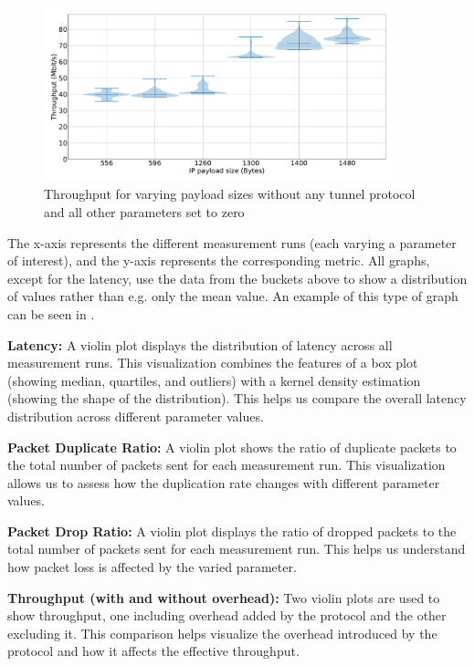\begin{figure}[tbh]
	\centering
	\includegraphics[draft=false,width=0.9\textwidth]{figures/Graphs/graph-4-mtu/throughput.pdf}
	\caption{Throughput for varying payload sizes without any tunnel protocol and all other parameters set to zero}
	\label{fig:graph-4-mtu-throughput}
\end{figure}

The x-axis represents the different measurement runs (each varying a parameter of interest), and the y-axis represents the corresponding metric.
All graphs, except for the latency, use the data from the buckets above to show a distribution of values rather than e.g. only the mean value.
An example of this type of graph can be seen in .

\noindent\textbf{Latency:} A violin plot displays the distribution of latency across all measurement runs.
This visualization combines the features of a box plot (showing median, quartiles, and outliers) with a kernel density estimation (showing the shape of the distribution).
This helps us compare the overall latency distribution across different parameter values.

\noindent\textbf{Packet Duplicate Ratio:} A violin plot shows the ratio of duplicate packets to the total number of packets sent for each measurement run.
This visualization allows us to assess how the duplication rate changes with different parameter values.

\noindent\textbf{Packet Drop Ratio:} A violin plot displays the ratio of dropped packets to the total number of packets sent for each measurement run.
This helps us understand how packet loss is affected by the varied parameter.

\noindent\textbf{Throughput (with and without overhead):} Two violin plots are used to show throughput, one including overhead added by the protocol and the other excluding it.
This comparison helps visualize the overhead introduced by the protocol and how it affects the effective throughput.

